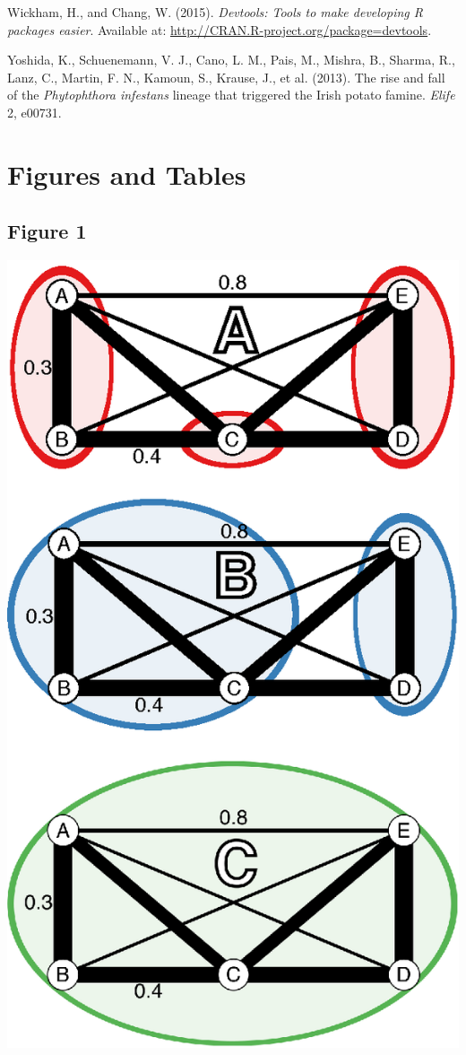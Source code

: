 \documentclass{frontiersSCNS} %
\begin{document}
Wickham, H., and Chang, W. (2015). \emph{Devtools: Tools to make
developing R packages easier}. Available at:
\url{http://CRAN.R-project.org/package=devtools}.

Yoshida, K., Schuenemann, V. J., Cano, L. M., Pais, M., Mishra, B.,
Sharma, R., Lanz, C., Martin, F. N., Kamoun, S., Krause, J., et al.
(2013). The rise and fall of the \emph{Phytophthora infestans} lineage
that triggered the Irish potato famine. \emph{Elife} 2, e00731.

\section*{Figures and Tables}\label{figures-and-tables}

\subsection*{Figure 1}\label{figure-1}

\includegraphics{poppr_frontiers_files/custom_figures/Figure-1.eps}
\end{document}
